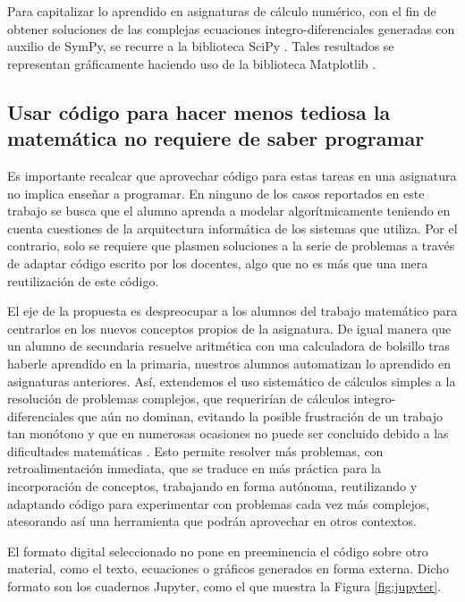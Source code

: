 \documentclass[a4paper]{fodami}        %
\begin{document}
Para capitalizar lo aprendido en asignaturas de cálculo numérico, con el fin de obtener soluciones de las complejas ecuaciones integro-diferenciales generadas con auxilio de SymPy, se recurre a la biblioteca SciPy \cite{2020SciPy-NMeth}.
Tales resultados se representan gráficamente haciendo uso de la biblioteca Matplotlib \cite{Hunter:2007}.


\subsection{Usar código para hacer menos tediosa la matemática no requiere de saber programar}

Es importante recalcar que aprovechar código para estas tareas en una asignatura no implica enseñar a programar.
En ninguno de los casos reportados en este trabajo se busca que el alumno aprenda a modelar algorítmicamente teniendo en cuenta cuestiones de la arquitectura informática de los sistemas que utiliza.
Por el contrario, solo se requiere que plasmen soluciones a la serie de problemas a través de adaptar código escrito por los docentes, algo que no es más que una mera reutilización de este código.

El eje de la propuesta es despreocupar a los alumnos del trabajo matemático para centrarlos en los nuevos conceptos propios de la asignatura.
De igual manera que un alumno de secundaria resuelve aritmética con una calculadora de bolsillo tras haberle aprendido en la primaria, nuestros alumnos automatizan lo aprendido en asignaturas anteriores.
Así, extendemos el uso sistemático de cálculos simples a la resolución de problemas complejos, que requerirían de cálculos integro-diferenciales que aún no dominan, evitando la posible frustración de un trabajo tan monótono y que en numerosas ocasiones no puede ser concluido debido a las dificultades matemáticas \cite{Pekrun2006}.
Esto permite resolver más problemas, con retroalimentación inmediata, que se traduce en más práctica para la incorporación de conceptos, trabajando en forma autónoma, reutilizando y adaptando código para experimentar con problemas cada vez más complejos, atesorando así una herramienta que podrán aprovechar en otros contextos.

El formato digital seleccionado no pone en preeminencia el código sobre otro material, como el texto, ecuaciones o gráficos generados en forma externa.
Dicho formato son los cuadernos Jupyter, como el que muestra la Figura \ref{fig:jupyter}.
\end{document}
